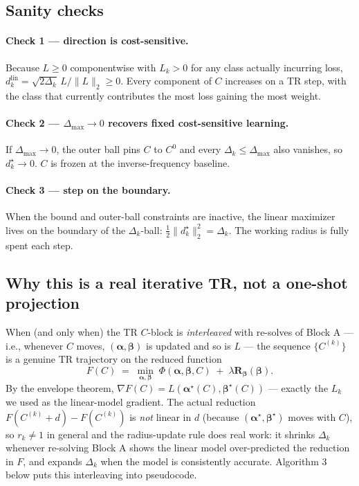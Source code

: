 \documentclass[11pt,a4paper]{article}
\begin{document}
\subsection{Sanity checks}

\paragraph{Check 1 --- direction is cost-sensitive.} Because $L \ge 0$ componentwise with $L_k > 0$ for any class actually incurring loss, $d_k^{\mathrm{lin}} = \sqrt{2\Delta_k}\,L/\|L\|_2 \ge 0$. Every component of $C$ increases on a TR step, with the class that currently contributes the most loss gaining the most weight. \checkmark

\paragraph{Check 2 --- $\Delta_{\max} \to 0$ recovers fixed cost-sensitive learning.} If $\Delta_{\max} \to 0$, the outer ball pins $C$ to $C^0$ and every $\Delta_k \le \Delta_{\max}$ also vanishes, so $d_k^\star \to 0$. $C$ is frozen at the inverse-frequency baseline. \checkmark

\paragraph{Check 3 --- step on the boundary.} When the bound and outer-ball constraints are inactive, the linear maximizer lives on the boundary of the $\Delta_k$-ball: $\tfrac12\|d_k^\star\|_2^2 = \Delta_k$. The working radius is fully spent each step. \checkmark

\subsection{Why this is a real iterative TR, not a one-shot projection}

When (and only when) the TR $C$-block is \emph{interleaved} with re-solves of Block A --- i.e., whenever $C$ moves, $(\boldsymbol\alpha,\boldsymbol\beta)$ is updated and so is $L$ --- the sequence $\{C^{(k)}\}$ is a genuine TR trajectory on the reduced function
\[
F(C) \;=\; \min_{\boldsymbol\alpha,\boldsymbol\beta}\;\Phi(\boldsymbol\alpha,\boldsymbol\beta,C) \;+\; \lambda \mathbf{R}_{\boldsymbol\beta}(\boldsymbol\beta).
\]
By the envelope theorem, $\nabla F(C) = L(\boldsymbol\alpha^\star(C),\boldsymbol\beta^\star(C))$ --- exactly the $L_k$ we used as the linear-model gradient. The actual reduction $F(C^{(k)}+d) - F(C^{(k)})$ is \emph{not} linear in $d$ (because $(\boldsymbol\alpha^\star,\boldsymbol\beta^\star)$ moves with $C$), so $r_k \neq 1$ in general and the radius-update rule does real work: it shrinks $\Delta_k$ whenever re-solving Block A shows the linear model over-predicted the reduction in $F$, and expands $\Delta_k$ when the model is consistently accurate. Algorithm 3 below puts this interleaving into pseudocode.
\end{document}

